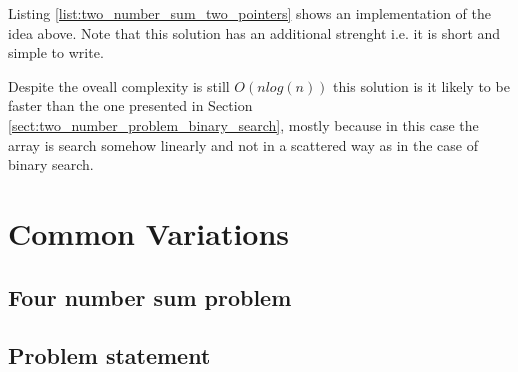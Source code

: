 Listing \ref{list:two_number_sum_two_pointers} shows an implementation of the idea above.  Note that
this solution has an additional strenght i.e.  it is short and simple to write. 



Despite the oveall complexity is still $O(n log(n))$ this solution is it likely to be faster than
the one presented in Section \ref{sect:two_number_problem_binary_search}, mostly because in this
case the array is search somehow linearly and not in a scattered way as in the case of binary
search.

\section{Common Variations}
\subsection{Four number sum problem}
\label{sec:four_number}

\subsection{Problem statement}


